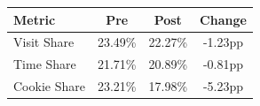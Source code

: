 \begin{tabular}{lccc}
\tabularnewline \midrule \midrule
Metric & Pre & Post & Change \\
\midrule
Visit Share & 23.49\% & 22.27\% & -1.23pp \\
Time Share & 21.71\% & 20.89\% & -0.81pp \\
Cookie Share & 23.21\% & 17.98\% & -5.23pp \\
\midrule \midrule
\end{tabular}
